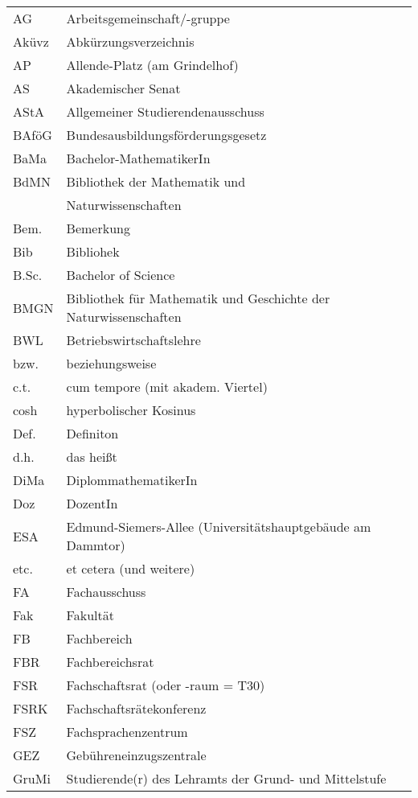 \scriptsize

\begin{tabular}{|p{10mm} p{68mm}|}
\hline
AG     	& Arbeitsgemeinschaft/-gruppe \\
Aküvz  	& Abkürzungsverzeichnis \\
AP     	& Allende-Platz (am Grindelhof) \\
AS     	& Akademischer Senat \\
AStA   	& Allgemeiner Studierendenausschuss \\
BAföG 	& Bundesausbildungsförderungsgesetz \\
BaMa		& Bachelor-MathematikerIn \\
BdMN    & Bibliothek der Mathematik und\\
       	& Naturwissenschaften \\
Bem.   	& Bemerkung \\
Bib			& Bibliohek \\
B.Sc.		& Bachelor of Science \\
BMGN		& Bibliothek für Mathematik und Geschichte der Naturwissenschaften \\
BWL    	& Betriebswirtschaftslehre \\
bzw.   	& beziehungsweise \\
c.t.   	& cum tempore (mit akadem. Viertel) \\
cosh   	& hyperbolischer Kosinus \\
Def.   	& Definiton \\
d.h.   	& das heißt \\
DiMa   	& DiplommathematikerIn \\
Doz    	& DozentIn \\
ESA    	& Edmund-Siemers-Allee (Universitäts\-haupt\-gebäude am Dammtor) \\
etc.   	& et cetera (und weitere) \\
FA			& Fachausschuss \\
Fak			& Fakultät \\
FB     	& Fachbereich \\
FBR    	& Fachbereichsrat \\
FSR    	& Fachschaftsrat (oder -raum = T30) \\
FSRK   	& Fachschaftsrätekonferenz \\
FSZ    	& Fachsprachenzentrum \\
GEZ    	& Gebühreneinzugszentrale \\
GruMi  	& Studierende(r) des Lehramts der Grund- und Mittelstufe \\

\end{tabular}
